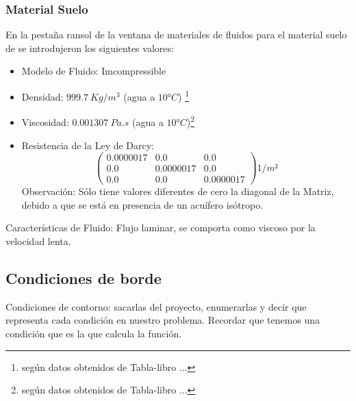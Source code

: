 \documentclass[10pt,a4paper,final]{article}
\begin{document}
\subsubsection{Material Suelo}
En la pestaña ransol de la ventana de materiales de fluidos para el material suelo de  se introdujeron los siguientes valores:
\begin{itemize}
\item Modelo de Fluido: Imcompressible
\item Densidad: $999.7~Kg/m^3$ (agua a $10° C$) \footnote{ según datos obtenidos de Tabla-libro ...}
\item Viscosidad: $0.001307~Pa.s$ (agua a $10° C$)\footnote{ según datos obtenidos de Tabla-libro ...}
\item Resistencia de la Ley de Darcy:
$$
\begin{pmatrix}{}
0.0000017 & 0.0 & 0.0 \\ 
0.0 & 0.0000017 & 0.0 \\ 
0.0 & 0.0 & 0.0000017
\end{pmatrix} 1/m²
$$
Observación: Sólo tiene valores diferentes de cero la diagonal de la Matriz, debido a que se está en presencia de un acuífero isótropo.
\end{itemize}
Características de Fluido: Flujo laminar, se comporta como viscoso por
la velocidad lenta.
%
%
\subsection{Condiciones de borde}
Condiciones de contorno: sacarlas del proyecto, enumerarlas y decir
que representa cada condición en nuestro problema. Recordar que
tenemos una condición que es la que calcula la función.
\end{document}

